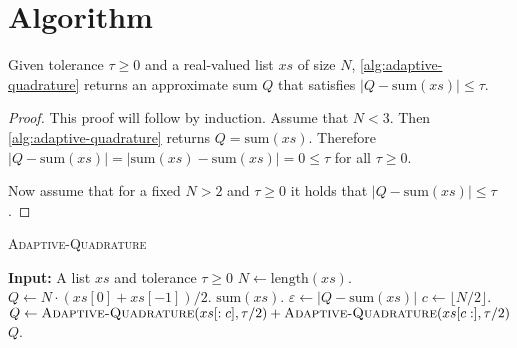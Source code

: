 \section{Algorithm}

\begin{proposition}
    Given tolerance $\tau \geq 0$ and a real-valued list $xs$ of size $N$, \cref{alg:adaptive-quadrature} returns an approximate sum $Q$ that satisfies $|Q - \text{sum}(xs)| \leq \tau$.  
\end{proposition}
\begin{proof}
    This proof will follow by induction. Assume that $N < 3$. Then \cref{alg:adaptive-quadrature} returns $Q = \text{sum}(xs)$. Therefore $|Q - \text{sum}(xs)| = |\text{sum}(xs) - \text{sum}(xs)| = 0 \leq \tau$ for all $\tau \geq 0$. 
    
    Now assume that for a fixed $N > 2$ and $\tau \geq 0$ it holds that $|Q - \text{sum}(xs)| \leq \tau$. 
\end{proof}

\begin{algorithm}[t]
    \caption{\textsc{Adaptive-Quadrature}}\label{alg:adaptive-quadrature}
    \begin{algorithmic}
    \State \textbf{Input:} A list $xs$ and tolerance $\tau \geq 0$
    \State $N \leftarrow \text{length}(xs)$.
        \State $Q \leftarrow N \cdot (xs[0] + xs[-1]) / 2$.
    \Else
        \State \Return $\text{sum}(xs)$.
    \EndIf
    \State $\varepsilon \leftarrow |Q - \text{sum}(xs)|$
    \If{$\varepsilon \geq \tau$}
        \State $c \leftarrow \lfloor N / 2 \rfloor$.
        \State $Q \leftarrow \textsc{Adaptive-Quadrature}(xs[:c], \tau /2) + \textsc{Adaptive-Quadrature}(xs[c:], \tau /2)$
    \EndIf
    \State \Return $Q$.
    \end{algorithmic}
    \end{algorithm}
